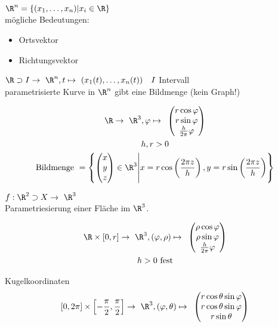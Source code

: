 $\R^n = \{ (x_1 , \dotsc , x_n ) | x_i \in \R \}$\\
mögliche Bedeutungen:
\begin{itemize}
	\item Ortsvektor
	\item Richtungsvektor
\end{itemize}

$\R \supset I \rightarrow \R^n , t \mapsto ( x_1(t) , \dotsc , x_n(t) ) \quad I$ Intervall\\
parametrisierte Kurve in $\R^n$ gibt eine Bildmenge (kein Graph!)\\
\begin{bsp*}[note = Schraubenlinie]
	\begin{gather*}
		\R \rightarrow \R^3 , \varphi \mapsto \begin{pmatrix}
			r \cos \varphi \\
			r \sin \varphi \\
			\frac{h}{2\pi} \varphi
		\end{pmatrix}\\
		h, r > 0 \\
		\text{Bildmenge } = \left\{ \begin{pmatrix}
			x \\
			y \\
			z
		\end{pmatrix} \in \R^3 \middle| x = r \cos\left( \frac{2 \pi z}{h} \right) , y = r \sin\left( \frac{2 \pi z}{h} \right) \right\}
	\end{gather*}
\end{bsp*}

$f: \R^2 \supset X \rightarrow \R^3$\\
Parametriesierung einer Fläche im $\R^3$.\\
\begin{bsp*}
	\begin{gather*}
		\R \times [0,r] \rightarrow \R^3 , (\varphi , \rho) \mapsto \begin{pmatrix}
			\rho \cos \varphi \\
			\rho \sin \varphi \\
			\frac{h}{2 \pi} \varphi
		\end{pmatrix}\\
		h > 0 \text{ fest}
	\end{gather*}
\end{bsp*}
\begin{bsp*}[note = Kugeloberfläche mit Radius $r>0$]
	Kugelkoordinaten
	\[
		[0,2 \pi] \times \left[ -\frac{\pi}{2} , \frac{\pi}{2} \right] \rightarrow \R^3 , (\varphi , \theta ) \mapsto \begin{pmatrix}
			r \cos \theta \sin \varphi \\
			r \cos \theta \sin \varphi \\
			r \sin \theta
		\end{pmatrix}
	\]
\end{bsp*}

